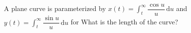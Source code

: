 A plane curve is parameterized by $x(t)=\displaystyle\int_{t}^{\infty} \dfrac {\cos u}{u} \, \mathrm{d}u $ and $ y(t) = \displaystyle\int_{t}^{\infty} \dfrac {\sin u}{u} \, \mathrm{d}u $ for  What is the length of the curve?